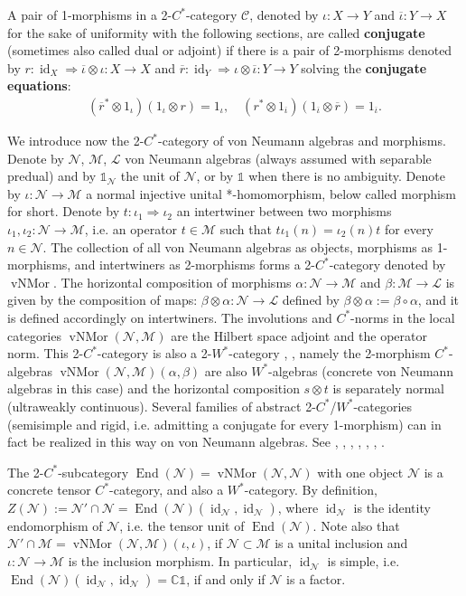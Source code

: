\documentclass[11pt,a4paper]{article}
\makeatletter
\newcommand{\oneop}{\mathds{1}}
\newcommand{\rbar}{{\overline{r}}}
\newcommand{\iotabar}{{\overline{\iota}}}
\newcommand{\C}{\mathcal{C}}
\newcommand{\cL}{\mathcal{L}}
\renewcommand{\L}{\cL}%
\newcommand{\M}{\mathcal{M}}
\newcommand{\N}{\mathcal{N}}
\renewcommand{\L}{\cL}
\newcommand{\CC}{\mathbb{C}}
\DeclareMathOperator{\End}{End}
\DeclareMathOperator{\vNMor}{vNMor}
\DeclareMathOperator{\id}{id}
\DeclareRobustCommand{\ie}{i.e.\@\xspace}
\newcommand{\Cstar}{$C^\ast$\@\xspace}
\newcommand{\Wstar}{$W^\ast$\@\xspace}
\theoremstyle{plain}
\theoremstyle{definition}
\theoremstyle{remark}
\numberwithin{equation}{section}%
\makeatother
\begin{document}
A pair of 1-morphisms in a 2-\Cstar-category $\C$, denoted by $\iota:X\to Y$ and $\iotabar:Y \to X$ for the sake of uniformity with the following sections, are called \textbf{conjugate} (sometimes also called dual or adjoint) if there is a pair of 2-morphisms denoted by $r: \id_X \Rightarrow \iotabar\otimes\iota : X\to X$ and $\rbar: \id_Y \Rightarrow \iota\otimes\iotabar : Y\to Y$ solving the \textbf{conjugate equations}:
 \begin{align}\label{eq:catconjeqns}
(\rbar^* \otimes 1_\iota) (1_\iota \otimes r) = 1_\iota , \quad (r^* \otimes 1_\iotabar) (1_\iotabar \otimes \rbar) = 1_\iotabar.
\end{align}

We introduce now the 2-\Cstar-category of von Neumann algebras and morphisms. Denote by $\N$, $\M$, $\L$ von Neumann algebras (always assumed with separable predual) and by $\oneop_\N$ the unit of $\N$, or by $\oneop$ when there is no ambiguity. Denote by $\iota: \N \to \M$ a normal injective unital *-homomorphism, below called morphism for short. Denote by $t:\iota_1 \Rightarrow \iota_2$ an intertwiner between two morphisms $\iota_1,\iota_2:\N\to\M$, \ie an operator $t\in\M$ such that $t \iota_1(n) = \iota_2(n) t$ for every $n\in\N$. 
The collection of all von Neumann algebras as objects, morphisms as 1-morphisms, and intertwiners as 2-morphisms forms a 2-\Cstar-category denoted by $\vNMor$. The horizontal composition of morphisms $\alpha:\N\to\M$ and $\beta:\M\to\L$ is given by the composition of maps: $\beta \otimes \alpha: \N\to\L$ defined by $\beta \otimes \alpha := \beta\circ\alpha$, and it is defined accordingly on intertwiners. The involutions and \Cstar-norms in the local categories $\vNMor(\N,\M)$ are the Hilbert space adjoint and the operator norm. This 2-\Cstar-category is also a 2-\Wstar-category \cite{GLR85}, \cite{CHPJP21}, namely the 2-morphism \Cstar-algebras $\vNMor(\N,\M)(\alpha,\beta)$ are also \Wstar-algebras (concrete von Neumann algebras in this case) and the horizontal composition $s\otimes t$ is separately normal (ultraweakly continuous). Several families of abstract 2-\Cstar/\Wstar-categories (semisimple and rigid, \ie admitting a conjugate for every 1-morphism) can in fact be realized in this way on von Neumann algebras. See \cite{HaYa00}, \cite{Yam03}, \cite{BHP12}, \cite{GiYu19}, \cite{HePe20}, \cite{GiYu20}, \cite{BCEGP20}.

The 2-\Cstar-subcategory $\End(\N) = \vNMor(\N,\N)$ with one object $\N$ is a concrete tensor \Cstar-category, and also a \Wstar-category. 
By definition, $Z(\N) := \N'\cap\N = \End(\N)(\id_\N,\id_\N)$, where $\id_{\N}$ is the identity endomorphism of $\N$, \ie the tensor unit of $\End(\N)$.
Note also that $\N'\cap\M = \vNMor(\N,\M)(\iota,\iota)$, if $\N\subset\M$ is a unital inclusion and $\iota:\N\to\M$ is the inclusion morphism.
In particular, $\id_{\N}$ is simple, \ie $\End(\N)(\id_\N,\id_\N) = \CC\oneop$,
if and only if $\N$ is a factor. 
\end{document}
